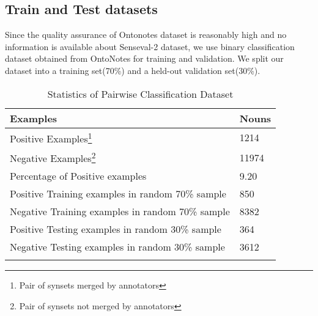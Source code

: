 \subsection{Train and Test datasets}
Since the quality assurance of Ontonotes dataset is reasonably high and no information is available about Senseval-2 dataset, we use binary classification dataset obtained from OntoNotes for training and validation. We split our dataset into a training set(70\%) and a held-out validation set(30\%). 
\begin{center}
\begin{longtable}{| l | l |}      
    \hline
    Examples & Nouns \\ \hline    
    Positive Examples\footnote{Pair of synsets merged by annotators} & 1214 \\ \hline
    Negative Examples\footnote{Pair of synsets not merged by annotators} & 11974 \\ \hline
    Percentage of Positive examples & 9.20 \\ \hline
    Positive Training examples in random 70\% sample & 850 \\ \hline
    Negative Training examples in random 70\% sample & 8382 \\ \hline
    Positive Testing examples in random 30\% sample & 364 \\ \hline
    Negative Testing examples in random 30\% sample & 3612 \\ \hline    
    \caption{Statistics of Pairwise Classification Dataset}
  \label{tab:pairwiseData}
\end{longtable}
\end{center}
\begin{comment}
\begin{center}
\begin{longtable}{| l | l | l |}      
    \hline
    Examples & Nouns & Verbs \\ \hline    
    Positive Examples\footnote{Pair of synsets merged by annotators} & 1214 & 6881 \\ \hline
    Negative Examples\footnote{Pair of synsets not merged by annotators} & 11974 & 20899 \\ \hline
    Percentage of Positive examples & 9.20 & 24.76 \\ \hline
    Positive Training examples in random 70\% sample & 850 & 4817\\ \hline
    Negative Training examples in random 70\% sample & 8382 & 14630\\ \hline
    Positive Testing examples in random 30\% sample & 364 & 2064\\ \hline
    Negative Testing examples in random 30\% sample & 3612 & 6269\\ \hline    
    \caption{Statistics of Pairwise Classification Dataset}
  \label{tab:pairwiseDataNounVerb}
\end{longtable}
\end{center}
\end{comment}

